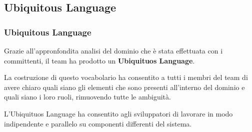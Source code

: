 \subsection{Ubiquitous Language}

\begin{frame}
    \frametitle{Ubiquitous Language}
    Grazie all'appronfondita analisi del dominio che è stata effettuata con i committenti, il team ha prodotto un
    \textbf{Ubiquituos Language}.

    \bigskip

    La costruzione di questo vocabolario ha consentito a tutti i membri del team di avere chiaro quali siano gli
    elementi che sono presenti all'interno del dominio e quali siano i loro ruoli, rimuovendo tutte le ambiguità.

    \bigskip

    L'Ubiquituos Language ha consentito agli sviluppatori di lavorare in modo indipendente e parallelo su componenti
    differenti del sistema.

\end{frame}
